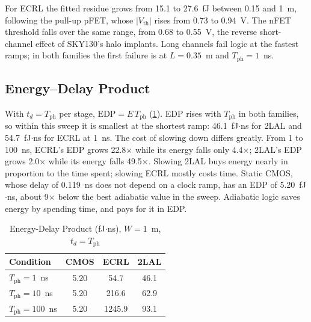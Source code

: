 \documentclass[conference]{IEEEtran}
\newcommand{\Tph}{T_{\mathrm{ph}}}
\newcommand{\EDP}{\mathrm{EDP}}
\begin{document}
For ECRL the fitted residue grows from 15.1 to 27.6~fJ between 0.15 and
1~\textmu m, following the pull-up pFET, whose $|V_{\mathrm{th}}|$ rises from
0.73 to 0.94~V. The nFET threshold falls over the same range, from 0.68 to
0.55~V, the reverse short-channel effect of SKY130's halo implants. Long
channels fail logic at the fastest ramps; in both families the first failure
is at $L=0.35$~\textmu m and $\Tph=1$~ns.

\subsection{Energy--Delay Product}
\label{sec:edp}
With $t_d=\Tph$ per stage, $\EDP=E\,\Tph$ (\cref{tab:edp}). EDP rises with
$\Tph$ in both families, so within this sweep it is smallest at the shortest
ramp: 46.1~fJ$\cdot$ns for 2LAL and 54.7~fJ$\cdot$ns for ECRL at 1~ns. The
cost of slowing down differs greatly. From 1 to 100~ns, ECRL's EDP grows
22.8$\times$ while its energy falls only 4.4$\times$; 2LAL's EDP grows
2.0$\times$ while its energy falls 49.5$\times$. Slowing 2LAL buys energy
nearly in proportion to the time spent; slowing ECRL mostly costs time.
Static CMOS, whose delay of 0.119~ns does not depend on a clock ramp, has an
EDP of 5.20~fJ$\cdot$ns, about 9$\times$ below the best adiabatic value in
the sweep. Adiabatic logic saves energy by spending time, and pays for it in
EDP.
\begin{table}[!t]
\caption{Energy-Delay Product (fJ$\cdot$ns), $W=1$~\textmu m, $t_d=\Tph$}
\label{tab:edp}
\centering
\begin{tabular}{@{}lccc@{}}
\toprule
\textbf{Condition} & \textbf{CMOS} & \textbf{ECRL} & \textbf{2LAL} \\
\midrule
$\Tph=1$~ns   & 5.20 & 54.7   & 46.1 \\
$\Tph=10$~ns  & 5.20 & 216.6  & 62.9 \\
$\Tph=100$~ns & 5.20 & 1245.9 & 93.1 \\
\bottomrule
\end{tabular}
\end{table}
\end{document}
